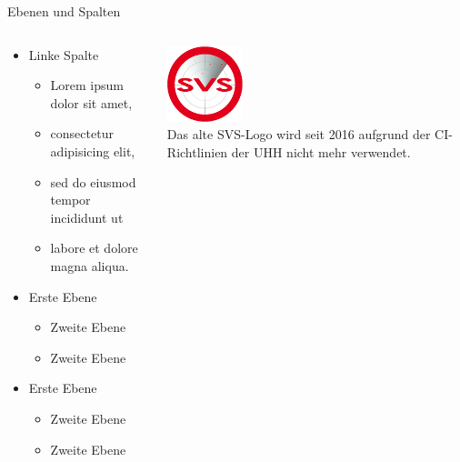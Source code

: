 \documentclass[t,aspectratio=169]{beamer}
\begin{document}
\usebackgroundtemplate{}

\begin{frame}{Ebenen und Spalten}
	\begin{columns}[T]
		\begin{column}{.57\textwidth}
			\begin{itemize}
				\item Linke Spalte
				\begin{itemize}
					\item Lorem ipsum dolor sit amet, 
					\item consectetur adipisicing elit, 
					\item sed do eiusmod tempor incididunt ut 
					\item labore et dolore magna aliqua. 
				\end{itemize}
				\item Erste Ebene
				\begin{itemize}
					\item Zweite Ebene
					\item Zweite Ebene
				\end{itemize}
				\item Erste Ebene
				\begin{itemize}
					\item Zweite Ebene
					\item Zweite Ebene
				\end{itemize}
			\end{itemize}
		\end{column}
		\begin{column}{.37\textwidth}
			\begin{center}
				\vspace{0.5cm}
				\includegraphics[width=2.2cm]{../pic/svs_logo_uhhred.png} \\
				\small
				Das alte SVS-Logo wird seit 2016 aufgrund der CI-Richtlinien der UHH nicht mehr verwendet.
			\end{center}
		\end{column}
	\end{columns}
\end{frame}
\end{document}
